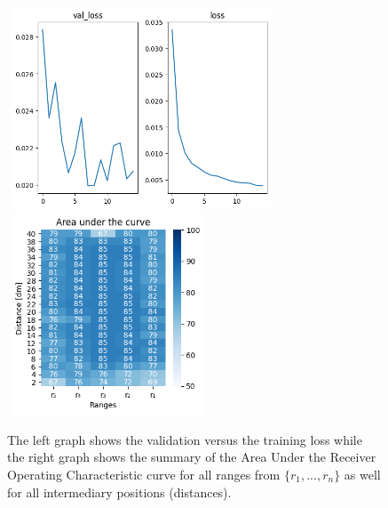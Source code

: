 \begin{multicols}{2}
\begin{itemize}
\newline
\newline
\newline
\newline
\newline
\end{itemize}
\end{multicols}\begin{figure}[H]%
\centering
\includegraphics[width=8cm,height=6cm]{3_models/models_47/graph_47.png}
\hspace{0.2 cm}
\includegraphics[width=6cm,height=6cm]{4_plots/plots_47/AUC_47.png}
\caption{The left graph shows the validation versus the training loss while the right graph shows the summary of the Area Under the Receiver Operating Characteristic curve for all ranges from $\{r_{1}, ... ,r_{n}\}$ as well for all intermediary positions (distances).}
\label{auc_47}
\end{figure}

\newpage
